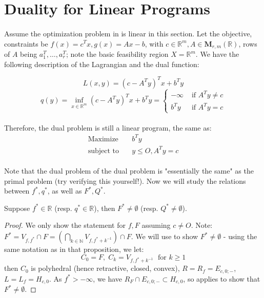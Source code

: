 \section{Duality for Linear Programs}
\label{sect:043}

\paragraph{}Assume the optimization problem in  is linear in this section. Let the objective, constraints be $f(x)=c^Tx,g(x)=Ax-b$, with $c\in \mathbb{R}^m,A\in \mathbf{M}_{r,m}(\mathbb{R})$, rows of $A$ being $a_1^T,\dotsc,a_r^T$; note the basic feasibility region $X=\mathbb{R}^m$. We have the following description of the Lagrangian and the dual function:

\[
	L(x,y) = (c-A^Ty)^Tx+b^Ty
\]
\[
	q(y) = \inf_{x\in \mathbb{R}^m} (c-A^Ty)^Tx + b^Ty=\begin{cases}
		-\infty & \text{ if }A^Ty\neq c \\
		b^Ty    & \text{ if }A^Ty=c
	\end{cases}
\]

\paragraph{}Therefore, the dual problem is still a linear program, the same as:
\begin{align*}
	\text{Maximize}\quad   & b^Ty           \\
	\text{subject to}\quad & y\leq O,A^Ty=c
\end{align*}

\paragraph{}Note that the dual problem of the dual problem is "essentially the same" as the primal problem (try verifying this yourself!). Now we will study the relations between $f^\ast,q^\ast$, as well as $F^\ast,Q^\ast$.

\begin{prop}\label{prop:043-linear-reachability}
	Suppose $f^\ast\in \mathbb{R}$ (resp. $q^\ast\in \mathbb{R}$), then $F^\ast\neq\emptyset$ (resp. $Q^\ast\neq\emptyset$).
\end{prop}

\begin{proof}
	We only show the statement for $f,F$ assuming $c\neq O$. Note: $F^\ast=V_{f,f^\ast}\cap F=\left(\bigcap_{k\in \mathbb{N}}V_{f,f^\ast+ k^{-1}}\right)\cap F$. We will use  to show $F^\ast\neq\emptyset$ - using the same notation as in that proposition, we let:
	\[
		C_0=F,\;C_k=V_{f,f^\ast+k^{-1}}\;\text{ for }k\geq 1
	\]
	then $C_0$ is polyhedral (hence retractive, closed, convex), $R=R_f=E_{c,0;-}$, $L=L_f=H_{c,0}$. As $f^\ast>-\infty$, we have $R_F\cap E_{c,0;-}\subset H_{c,0}$, so  applies to show that $F^\ast\neq\emptyset$.
\end{proof}

